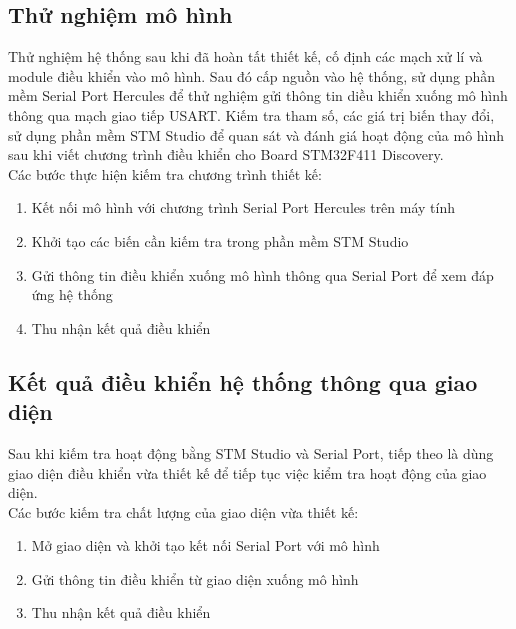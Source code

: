 \documentclass[a4paper, 12pt]{article}
\begin{document}
\subsection{Thử nghiệm mô hình}
\hspace{0.5cm}
Thử nghiệm hệ thống sau khi đã hoàn tất thiết kế, cố định các mạch xử lí và module điều khiển vào mô hình. Sau đó cấp nguồn vào hệ thống, sử dụng phần mềm Serial Port Hercules để thử nghiệm gửi thông tin diều khiển xuống mô hình thông qua mạch giao tiếp USART. Kiếm tra tham số, các giá trị biến thay đổi, sử dụng phần mềm STM Studio để quan sát và đánh giá hoạt động của mô hình sau khi viết chương trình điều khiển cho Board STM32F411 Discovery.\\\indent
Các bước thực hiện kiếm tra chương trình thiết kế:\\
\begin{enumerate}
	\item Kết nối mô hình với chương trình Serial Port Hercules trên máy tính
	
	\item Khởi tạo các biến cần kiếm tra trong phần mềm STM Studio
	
	\item Gửi thông tin điều khiển xuống mô hình thông qua Serial Port để xem đáp ứng hệ thống
	
	\item Thu nhận kết quả điều khiển
	
\end{enumerate}
\newpage
\subsection{Kết quả điều khiển hệ thống thông qua giao diện}
\hspace{0.5cm}
Sau khi kiếm tra hoạt động bằng STM Studio và Serial Port, tiếp theo là dùng giao diện điều khiển vừa thiết kế để tiếp tục việc kiểm tra hoạt động của giao diện.\\\indent
Các bước kiếm tra chất lượng của giao diện vừa thiết kế:\\
\begin{enumerate}
	\item Mở giao diện và khởi tạo kết nối Serial Port với mô hình
	
	\item Gửi thông tin điều khiển từ giao diện xuống mô hình
	
	\item Thu nhận kết quả điều khiển
\end{enumerate}
\end{document}
